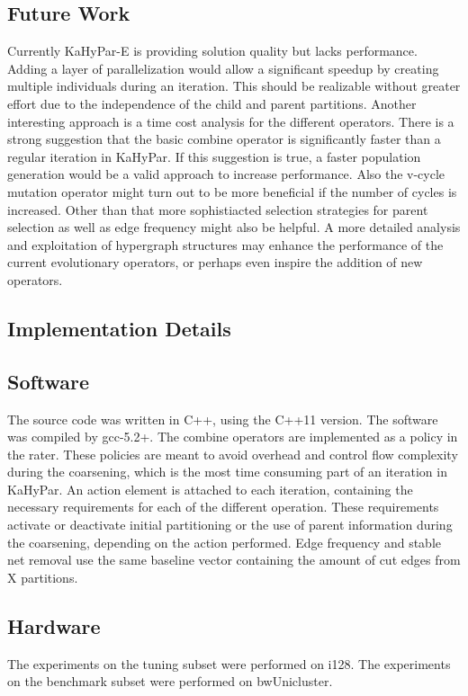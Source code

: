 \documentclass[a4paper,12pt,titlepage, BCOR7mm,headsepline]{scrbook}
\numberwithin{equation}{section}
\begin{document}
\section{Future Work}
Currently KaHyPar-E is providing solution quality but lacks performance. Adding a layer of parallelization would allow a significant speedup by creating multiple individuals during an iteration. This should be realizable without greater effort due to the independence of the child and parent partitions. Another interesting approach is a time cost analysis for the different operators. There is a strong suggestion that the basic combine operator is significantly faster than a regular iteration in KaHyPar. If this suggestion is true, a faster population generation would be a valid approach to increase performance. Also the v-cycle mutation operator might turn out to be more beneficial if the number of cycles is increased. Other than that more sophistiacted selection strategies for parent selection as well as edge frequency might also be helpful. A more detailed analysis and exploitation of hypergraph structures may enhance the performance of the current evolutionary operators, or perhaps even inspire the addition of new operators.

\clearpage
\begin{appendix}
\chapter{Implementation Details}
\section{Software}
The source code was written in C++, using the C++11 version. The software was compiled by gcc-5.2+. The combine operators are implemented as a policy in the rater. These policies are meant to avoid overhead and control flow complexity during the coarsening, which is the most time consuming part of an iteration in KaHyPar. An action element is attached to each iteration, containing the necessary requirements for each of the different operation. These requirements activate or deactivate 
initial partitioning or the use of parent information during the coarsening, depending on the action performed. Edge frequency and stable net removal use the same baseline vector containing the amount of cut edges from X partitions. 
\section{Hardware}
The experiments on the tuning subset were performed on i128.
The experiments on the benchmark subset were performed on bwUnicluster.
\end{appendix}


\end{document}
